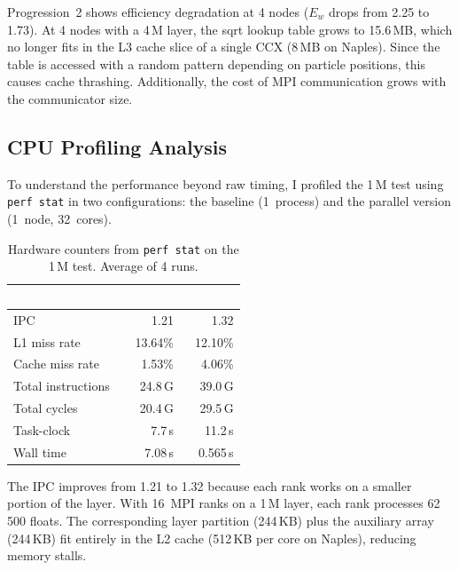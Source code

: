 \documentclass[10pt,dvipsnames,table,twocolumn]{article}
\let\oldtexttt\texttt
\renewcommand{\texttt}[1]{%
  {\small\colorbox{Mist}{\oldtexttt{\textcolor{DarkInk}{#1}}}}%
}
\begin{document}
Progression~2 shows efficiency degradation at 4 nodes ($E_w$ drops from 2.25 to 1.73). At 4 nodes with a 4\,M layer, the sqrt lookup table grows to 15.6\,MB, which no longer fits in the L3 cache slice of a single CCX (8\,MB on Naples). Since the table is accessed with a random pattern depending on particle positions, this causes cache thrashing. Additionally, the cost of MPI communication grows with the communicator size.


\subsection{CPU Profiling Analysis}\label{sec:cpu-prof}

To understand the performance beyond raw timing, I profiled the 1\,M test using \texttt{perf~stat} in two configurations: the baseline (1~process) and the parallel version (1~node, 32~cores).

\begin{table}[t]
\centering
\caption{Hardware counters from \texttt{perf~stat} on the 1\,M test. Average of 4 runs.}\label{tbl:perf}
\small
\begin{tabular}{@{}lrr@{}}
\rowcolor{TableHead}
\textcolor{white}{\textbf{Metric}} &
\textcolor{white}{\textbf{Baseline}} &
\textcolor{white}{\textbf{Parallel}} \\
\midrule
IPC                     & 1.21          & 1.32 \\
\rowcolor{TableRowAlt}
L1 miss rate            & 13.64\%       & 12.10\% \\
Cache miss rate         & 1.53\%        & 4.06\% \\
\rowcolor{TableRowAlt}
Total instructions      & 24.8\,G       & 39.0\,G \\
Total cycles            & 20.4\,G       & 29.5\,G \\
\rowcolor{TableRowAlt}
Task-clock              & 7.7\,s        & 11.2\,s \\
Wall time               & 7.08\,s       & 0.565\,s \\
\bottomrule
\end{tabular}
\end{table}

The IPC improves from 1.21 to 1.32 because each rank works on a smaller portion of the layer. With 16~MPI ranks on a 1\,M layer, each rank processes 62\,500 floats. The corresponding layer partition (244\,KB) plus the auxiliary array (244\,KB) fit entirely in the L2 cache (512\,KB per core on Naples), reducing memory stalls.
\end{document}
